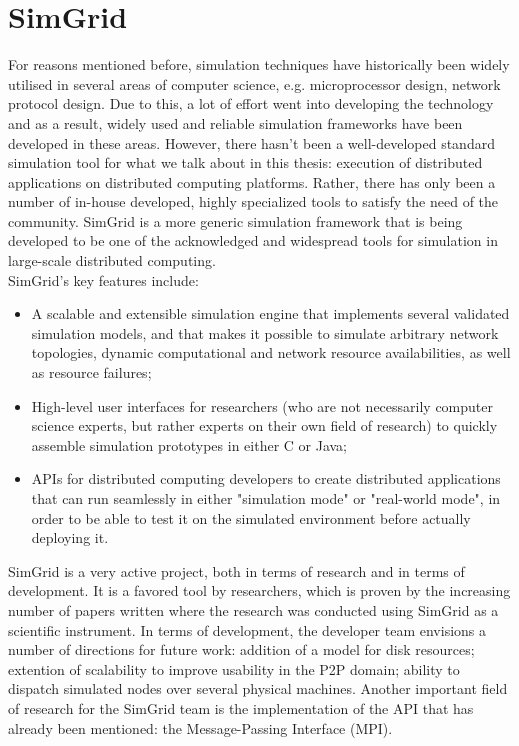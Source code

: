 \section{SimGrid}
For reasons mentioned before, simulation techniques have historically
been widely utilised in several areas of computer science,
e.g. microprocessor design, network protocol design. Due to this, a
lot of effort went into developing the technology and as a result,
widely used and reliable simulation frameworks have been developed in
these areas. However, there hasn't been a well-developed standard
simulation tool for what we talk about in this thesis: execution of
distributed applications on distributed computing platforms. Rather,
there has only been a number of in-house developed, highly specialized
tools to satisfy the need of the community. SimGrid is a more generic
simulation framework that is being developed to be one of the
acknowledged and widespread tools for simulation in large-scale
distributed computing.\cite{clq08}\\
SimGrid's key features include:\cite{clq08}
\begin{itemize}
\item A scalable and extensible simulation engine that implements
  several validated simulation models, and that makes it possible to
  simulate arbitrary network topologies, dynamic computational and
  network resource availabilities, as well as resource failures;
\item High-level user interfaces for researchers (who are not
  necessarily computer science experts, but rather experts on their own
  field of research) to quickly assemble simulation prototypes in either
  C or Java;
\item APIs for distributed computing developers to create distributed
  applications that can run seamlessly in either "simulation mode" or
  "real-world mode", in order to be able to test it on the simulated
  environment before actually deploying it.
\end{itemize}
SimGrid is a very active project, both in terms of research and in
terms of development. It is a favored tool by researchers, which is
proven by the increasing number of papers written where the research
was conducted using SimGrid as a scientific instrument. In terms of
development, the developer team envisions a number of directions for
future work: addition of a model for disk resources; extention of
scalability to improve usability in the P2P domain; ability to
dispatch simulated nodes over several physical machines.\cite{clq08}
Another important field of research for the SimGrid team is the
implementation of the API that has already been mentioned: the
Message-Passing Interface (MPI).
